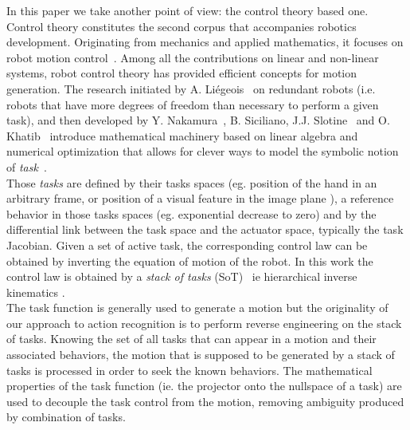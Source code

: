 \documentclass[letterpaper, 10pt, conference]{ieeeconf}      %
\begin{document}
In this paper we take another point of view: the control theory based
one. Control theory constitutes the second corpus that accompanies
robotics development. Originating from mechanics and applied
mathematics, it focuses on robot motion control~\cite{murray94,
siciliano10}. Among all the
contributions on linear and non-linear systems, robot control theory has
provided efficient concepts for motion generation. The research
initiated by A. Li\'egeois~\cite{liegeois77} on redundant robots (i.e. robots that have
more degrees of freedom than necessary to perform a given task), and
then developed by Y. Nakamura~\cite{nakamura91}, B. Siciliano, J.J. Slotine~\cite{siciliano91} and O.
Khatib~\cite{khatib87} introduce mathematical machinery based on linear algebra and
numerical optimization that allows for clever ways to model the symbolic
notion of \emph{task}~\cite{samson91}.\\

Those \emph{tasks} are defined by their tasks spaces (eg. position of the hand
in an arbitrary frame\cite{nakamura86a,khatib87b}, or position of a visual feature in the image
plane \cite{espiau92,hutchinson96a}), a reference behavior in those tasks spaces
(eg. exponential decrease to zero) and by the differential link between
the task space and the actuator space, typically the task Jacobian.
Given a set of active task, the corresponding control law can be
obtained by inverting the equation of motion of the robot. In this work
the control law is obtained by a \emph{stack of tasks}
(SoT)~\cite{mansard07} ie hierarchical inverse kinematics
\cite{siciliano91}.\\

The task function is generally used to generate a motion but
the originality of our approach to action recognition is to perform
reverse engineering on the stack of tasks. Knowing the set of
all tasks that can appear in a motion and their associated behaviors, 
the motion that is supposed to be generated by a stack of tasks is processed in order to
seek the known behaviors. The mathematical properties of the task function (ie. the projector onto
the nullspace of a task) are used to decouple the task control from the motion, removing
ambiguity produced by combination of tasks.\\
\end{document}
